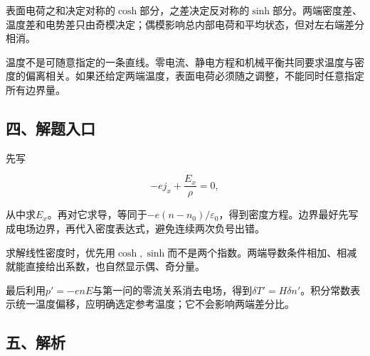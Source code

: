 \documentclass[12pt,a4paper,fontset=fandol]{ctexart}
\begin{document}
\begin{center}
\begin{minipage}{\linewidth}
\centering\begingroup{}
\ifdim\wd\diagrambox>.88\linewidth
\sbox{\diagrambox}{\resizebox{.88\linewidth}{!}{\usebox{\diagrambox}}}\fi
\ifdim\ht\diagrambox>.38\textheight
\resizebox{!}{.38\textheight}{\usebox{\diagrambox}}
\else\usebox{\diagrambox}\fi
\par{}\endgroup\end{minipage}\end{center}

表面电荷之和决定对称的\(\cosh\)部分，之差决定反对称的\(\sinh\)部分。两端密度差、温度差和电势差只由奇模决定；偶模影响总内部电荷和平均状态，但对左右端差分相消。

温度不是可随意指定的一条直线。零电流、静电方程和机械平衡共同要求温度与密度的偏离相关。如果还给定两端温度，表面电荷必须随之调整，不能同时任意指定所有边界量。

\subsection{四、解题入口}\label{ux56dbux89e3ux9898ux5165ux53e3-5}

先写

\[
-ej_x+\frac{E_x}{\rho}=0,
\]

从中求\(E_x\)。再对它求导，等同于\(-e(n-n_0)/\varepsilon_0\)，得到密度方程。边界最好先写成电场边界，再代入密度表达式，避免连续两次负号出错。

求解线性密度时，优先用\(\cosh,\sinh\)而不是两个指数。两端导数条件相加、相减就能直接给出系数，也自然显示偶、奇分量。

最后利用\(p'=-enE\)与第一问的零流关系消去电场，得到\(\delta T'=H\delta n'\)。积分常数表示统一温度偏移，应明确选定参考温度；它不会影响两端差分比。

\subsection{五、解析}\label{ux4e94ux89e3ux6790-5}
\end{document}
